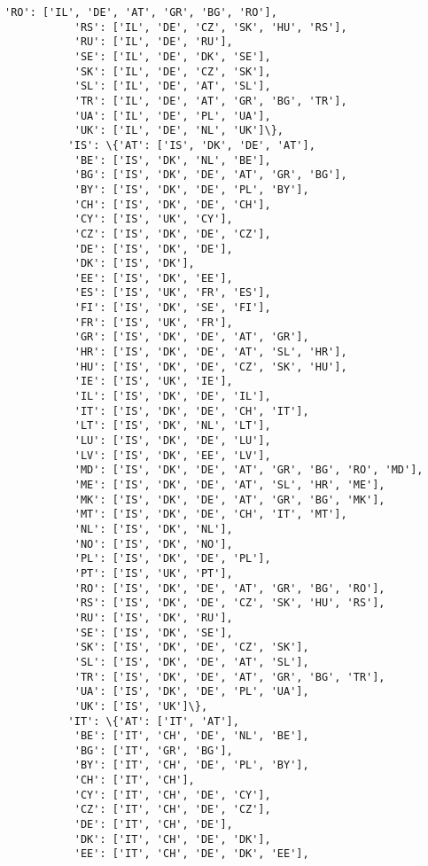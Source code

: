 \documentclass[11pt]{article}
\begin{document}
\begin{Verbatim}[commandchars=\\\{\}]
           'RO': ['IL', 'DE', 'AT', 'GR', 'BG', 'RO'],
           'RS': ['IL', 'DE', 'CZ', 'SK', 'HU', 'RS'],
           'RU': ['IL', 'DE', 'RU'],
           'SE': ['IL', 'DE', 'DK', 'SE'],
           'SK': ['IL', 'DE', 'CZ', 'SK'],
           'SL': ['IL', 'DE', 'AT', 'SL'],
           'TR': ['IL', 'DE', 'AT', 'GR', 'BG', 'TR'],
           'UA': ['IL', 'DE', 'PL', 'UA'],
           'UK': ['IL', 'DE', 'NL', 'UK']\},
          'IS': \{'AT': ['IS', 'DK', 'DE', 'AT'],
           'BE': ['IS', 'DK', 'NL', 'BE'],
           'BG': ['IS', 'DK', 'DE', 'AT', 'GR', 'BG'],
           'BY': ['IS', 'DK', 'DE', 'PL', 'BY'],
           'CH': ['IS', 'DK', 'DE', 'CH'],
           'CY': ['IS', 'UK', 'CY'],
           'CZ': ['IS', 'DK', 'DE', 'CZ'],
           'DE': ['IS', 'DK', 'DE'],
           'DK': ['IS', 'DK'],
           'EE': ['IS', 'DK', 'EE'],
           'ES': ['IS', 'UK', 'FR', 'ES'],
           'FI': ['IS', 'DK', 'SE', 'FI'],
           'FR': ['IS', 'UK', 'FR'],
           'GR': ['IS', 'DK', 'DE', 'AT', 'GR'],
           'HR': ['IS', 'DK', 'DE', 'AT', 'SL', 'HR'],
           'HU': ['IS', 'DK', 'DE', 'CZ', 'SK', 'HU'],
           'IE': ['IS', 'UK', 'IE'],
           'IL': ['IS', 'DK', 'DE', 'IL'],
           'IT': ['IS', 'DK', 'DE', 'CH', 'IT'],
           'LT': ['IS', 'DK', 'NL', 'LT'],
           'LU': ['IS', 'DK', 'DE', 'LU'],
           'LV': ['IS', 'DK', 'EE', 'LV'],
           'MD': ['IS', 'DK', 'DE', 'AT', 'GR', 'BG', 'RO', 'MD'],
           'ME': ['IS', 'DK', 'DE', 'AT', 'SL', 'HR', 'ME'],
           'MK': ['IS', 'DK', 'DE', 'AT', 'GR', 'BG', 'MK'],
           'MT': ['IS', 'DK', 'DE', 'CH', 'IT', 'MT'],
           'NL': ['IS', 'DK', 'NL'],
           'NO': ['IS', 'DK', 'NO'],
           'PL': ['IS', 'DK', 'DE', 'PL'],
           'PT': ['IS', 'UK', 'PT'],
           'RO': ['IS', 'DK', 'DE', 'AT', 'GR', 'BG', 'RO'],
           'RS': ['IS', 'DK', 'DE', 'CZ', 'SK', 'HU', 'RS'],
           'RU': ['IS', 'DK', 'RU'],
           'SE': ['IS', 'DK', 'SE'],
           'SK': ['IS', 'DK', 'DE', 'CZ', 'SK'],
           'SL': ['IS', 'DK', 'DE', 'AT', 'SL'],
           'TR': ['IS', 'DK', 'DE', 'AT', 'GR', 'BG', 'TR'],
           'UA': ['IS', 'DK', 'DE', 'PL', 'UA'],
           'UK': ['IS', 'UK']\},
          'IT': \{'AT': ['IT', 'AT'],
           'BE': ['IT', 'CH', 'DE', 'NL', 'BE'],
           'BG': ['IT', 'GR', 'BG'],
           'BY': ['IT', 'CH', 'DE', 'PL', 'BY'],
           'CH': ['IT', 'CH'],
           'CY': ['IT', 'CH', 'DE', 'CY'],
           'CZ': ['IT', 'CH', 'DE', 'CZ'],
           'DE': ['IT', 'CH', 'DE'],
           'DK': ['IT', 'CH', 'DE', 'DK'],
           'EE': ['IT', 'CH', 'DE', 'DK', 'EE'],

\end{Verbatim}
\end{document}
